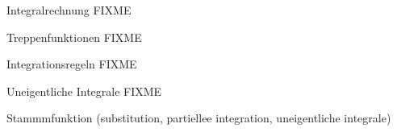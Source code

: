 Integralrechnung FIXME

Treppenfunktionen FIXME

Integrationsregeln FIXME

Uneigentliche Integrale FIXME

Stammmfunktion (substitution, partiellee integration, uneigentliche integrale)

